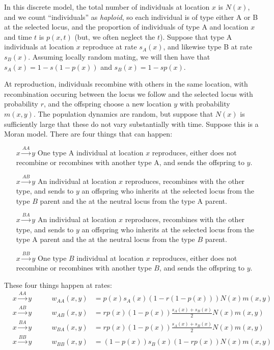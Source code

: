 \documentclass[11pt,letterpaper]{article}
\begin{document}
In this discrete model, the total number of individuals at location $x$ is $N(x)$,
and we count ``individuals'' as \emph{haploid},
so each individual is of type either A or B at the selected locus,
and the proportion of individuals of type A and location $x$ and time $t$ is $p(x,t)$
(but, we often neglect the $t$).
Suppose that type A individuals at location $x$ reproduce at rate $s_A(x)$, 
and likewise type B at rate $s_B(x)$.
Assuming locally random mating, we will then have that
$s_A(x) = 1 - s (1-p(x))$ and $s_B(x) = 1 - s p(x)$.

At reproduction, individuals recombine with others in the same location,
with recombination occuring between the locus we follow and the selected locus with probability $r$,
and the offspring choose a new location $y$ with probability $m(x,y)$.
The population dynamics are random, 
but suppose that $N(x)$ is sufficiently large that these do not vary substantially with time.
Suppose this is a Moran model.
There are four things that can happen:
\begin{enumerate}
    \item[$x\xrightarrow{AA}y$] One type A individual at location $x$ reproduces, 
        either does not recombine or recombines with another type A,
        and sends the offspring to $y$.
    \item[$x\xrightarrow{AB}y$] An individual at location $x$ reproduces, 
        recombines with the other type,
        and sends to $y$ an offspring
        who inherits at the selected locus from the type $B$ parent 
        and the at the neutral locus from the type A parent.
    \item[$x\xrightarrow{BA}y$] An individual at location $x$ reproduces, 
        recombines with the other type,
        and sends to $y$ an offspring
        who inherits at the selected locus from the type A parent 
        and the at the neutral locus from the type $B$ parent.
    \item[$x\xrightarrow{BB}y$] One type $B$ individual at location $x$ reproduces, 
        either does not recombine or recombines with another type $B$,
        and sends the offspring to $y$.
\end{enumerate}
These four things happen at rates:
\begin{align}
    & x\xrightarrow{AA}y & \qquad w_{AA}(x,y) &= p(x) s_A(x) \left(1 - r (1-p(x)) \right)  N(x) m(x,y) \\
    & x\xrightarrow{AB}y & \qquad w_{AB}(x,y) &= r p(x) (1-p(x)) \frac{s_A(x)+s_B(x)}{2} N(x) m(x,y) \\
    & x\xrightarrow{BA}y & \qquad w_{BA}(x,y) &= r p(x) (1-p(x)) \frac{s_A(x)+s_B(x)}{2} N(x) m(x,y) \\
    & x\xrightarrow{BB}y & \qquad w_{BB}(x,y) &= (1-p(x)) s_B(x) \left(1 - r p(x) \right) N(x) m(x,y) 
\end{align}
\end{document}
